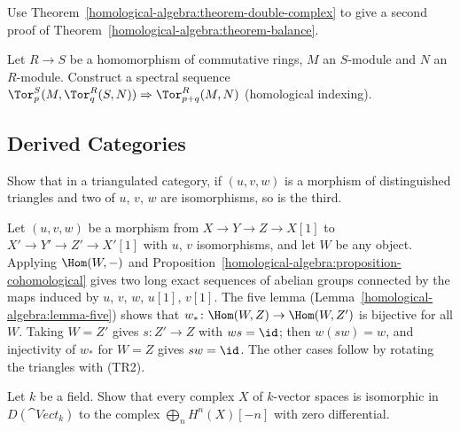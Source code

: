 \begin{exercise}\label{homological-algebra:exercise-balance-ss}
Use Theorem~\ref{homological-algebra:theorem-double-complex} to give a second proof of
Theorem~\ref{homological-algebra:theorem-balance}.
\end{exercise}

\begin{exercise}\label{homological-algebra:exercise-base-change-tor}
Let $R \to S$ be a homomorphism of commutative rings, $M$ an $S$-module and $N$ an $R$-module. Construct a spectral sequence
$\Tor_p^S(M, \Tor_q^R(S, N)) \Rightarrow \Tor_{p+q}^R(M, N)$ (homological indexing).
\end{exercise}

\subsection{Derived Categories}\label{homological-algebra:subsection-exercises-derived-categories}

\begin{exercise}\label{homological-algebra:exercise-five-lemma-triangles}
Show that in a triangulated category, if $(u, v, w)$ is a morphism of distinguished triangles and two of $u$, $v$, $w$ are isomorphisms, so is the
third.
\end{exercise}

\begin{solution}
Let $(u, v, w)$ be a morphism from $X \to Y \to Z \to X[1]$ to $X' \to Y' \to Z' \to X'[1]$ with $u$, $v$ isomorphisms, and let $W$ be any object.
Applying $\Hom(W, -)$ and Proposition~\ref{homological-algebra:proposition-cohomological} gives two long exact sequences of abelian groups
connected by the maps induced by $u$, $v$, $w$, $u[1]$, $v[1]$. The five lemma (Lemma~\ref{homological-algebra:lemma-five}) shows that
$w_* \colon \Hom(W, Z) \to \Hom(W, Z')$ is bijective for all $W$. Taking $W = Z'$ gives $s \colon Z' \to Z$ with $ws = \id$; then $w(sw) = w$, and
injectivity of $w_*$ for $W = Z$ gives $sw = \id$. The other cases follow by rotating the triangles with (TR2).
\end{solution}

\begin{exercise}\label{homological-algebra:exercise-split-complex}
Let $k$ be a field. Show that every complex $X$ of $k$-vector spaces is isomorphic in $D(\cat{Vect}_k)$ to the complex $\bigoplus_n H^n(X)[-n]$ with
zero differential.
\end{exercise}

